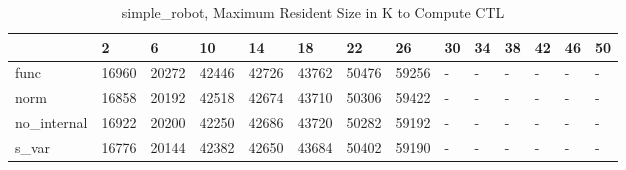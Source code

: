 \begin{table}
\caption{simple_robot, Maximum Resident Size in K to Compute CTL}
\label{simple_robot_CTL_size}
\begin{tabular}{llllllllllllll}
\toprule
 & 2 & 6 & 10 & 14 & 18 & 22 & 26 & 30 & 34 & 38 & 42 & 46 & 50 \\
\midrule
func & 16960 & 20272 & 42446 & 42726 & 43762 & 50476 & 59256 & - & - & - & - & - & - \\
norm & 16858 & 20192 & 42518 & 42674 & 43710 & 50306 & 59422 & - & - & - & - & - & - \\
no_internal & 16922 & 20200 & 42250 & 42686 & 43720 & 50282 & 59192 & - & - & - & - & - & - \\
s_var & 16776 & 20144 & 42382 & 42650 & 43684 & 50402 & 59190 & - & - & - & - & - & - \\
\bottomrule
\end{tabular}
\end{table}
